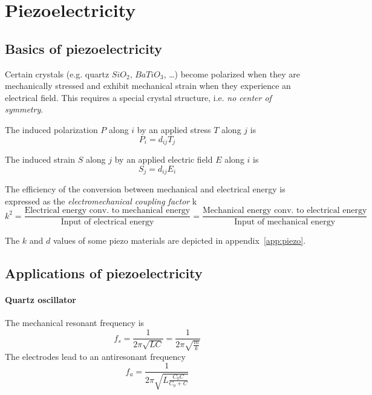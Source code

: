 \section{Piezoelectricity}
\subsection{Basics of piezoelectricity}
Certain crystals (e.g. quartz $SiO_2$, $BaTiO_3$, \ldots) become polarized
when they are mechanically stressed and exhibit mechanical strain when
they experience an electrical field.
This requires a special crystal structure, i.e. \emph{no center of symmetry}.

The induced polarization $P$ along $i$ by an applied stress $T$ along $j$ is
\begin{equation}
    P_i = d_{ij} T_j
\end{equation}

The induced strain $S$ along $j$ by an applied electric field $E$ along $i$ is
\begin{equation}
    S_j = d_{ij} E_i
\end{equation}


The efficiency of the conversion between mechanical and electrical energy is
expressed as the \emph{electromechanical coupling factor} k
\begin{equation}
    k^2 = \frac{\text{Electrical energy conv. to mechanical energy}}{\text{Input of electrical energy}} = \frac{\text{Mechanical energy conv. to electrical energy}}{\text{Input of mechanical energy}}
\end{equation}

The $k$ and $d$ values of some piezo materials are depicted in appendix~\ref{app:piezo}.

\subsection{Applications of piezoelectricity}
\paragraph{Quartz oscillator}
The mechanical resonant frequency is
\begin{equation}
    f_s = \frac{1}{2\pi\sqrt{LC}} = \frac{1}{2\pi\sqrt{\frac{m}{k}}}
\end{equation}
The electrodes lead to an antiresonant frequency
\begin{equation}
    f_a = \frac{1}{2\pi\sqrt{L\frac{C_0C}{C_0+C}}}
\end{equation}

